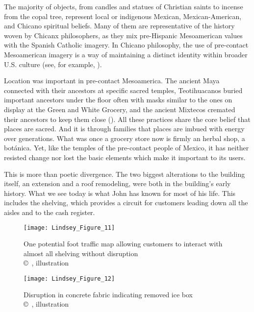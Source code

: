 The majority of objects, from candles and statues of Christian saints to incense from the copal tree, represent local or indigenous Mexican, Mexican-American, and Chicano spiritual beliefs. Many of them are representative of the history woven by Chicanx philosophers, as they mix pre-Hispanic Mesoamerican values with the Spanish Catholic imagery. In Chicano philosophy, the use of pre-contact Mesoamerican imagery is a way of maintaining a distinct identity within broader U.S. culture (see, for example, \cite{anzaldua}).

Location was important in pre-contact Mesoamerica. The ancient Maya connected with their ancestors at specific sacred temples, Teotihuacanos buried important ancestors under the floor often with masks similar to the ones on display at the Green and White Grocery, and the ancient Mixtecos cremated their ancestors to keep them close (\cites[184]{ashmore}{linne}[7]{joyce}). All these practices share the core belief that places are sacred. And it is through families that places are imbued with energy over generations. What was once a grocery store now is firmly an herbal shop, a botánica. Yet, like the temples of the pre-contact people of Mexico, it has neither resisted change nor lost the basic elements which make it important to its users.

This is more than poetic divergence. The two biggest alterations to the building itself, an extension and a roof remodeling, were both in the building's early history. What we see today is what John has known for most of his life. This includes the shelving, which provides a circuit for customers leading down all the aisles and to the cash register.

\begin{figure}[!tb]
	\begin{minipage}[t]{.49\linewidth}
	\texttt{[image: Lindsey\_Figure\_11]}
	\caption{One potential foot traffic map allowing customers to interact with almost all shelving without disruption\\
		{\normalfont\scriptsize \copyright\
			\shortauthor, illustration
	}}
	\label{fig:Lindsey_Figure_11}
\end{minipage}
\hfill
	\begin{minipage}[t]{.49\linewidth}
	\texttt{[image: Lindsey\_Figure\_12]}
	\caption{Disruption in concrete fabric indicating removed ice box\\
		{\normalfont\scriptsize \copyright\
			\shortauthor, illustration
	}}
	\label{fig:Lindsey_Figure_12}
\end{minipage}
\end{figure}



